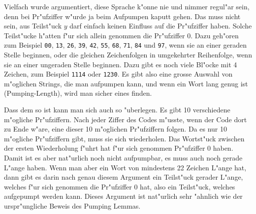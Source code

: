 \begin{loesung}
Vielfach wurde argumentiert, diese Sprache k"onne nie und nimmer
regul"ar sein, denn bei Pr"ufziffer w"urde ja beim Aufpumpen
kaputt gehen. Das muss nicht sein, aus Teilst"uck $y$ darf
einfach keinen Einfluss auf die Pr"ufziffer haben. Solche
Teilst"ucke h"atten f"ur sich allein genommen die Pr"ufziffer 0.
Dazu geh"oren zum Beispiel
{\tt 00},
{\tt 13},
{\tt 26},
{\tt 39},
{\tt 42},
{\tt 55},
{\tt 68},
{\tt 71},
{\tt 84}
und
{\tt 97}, wenn sie an einer geraden Stelle beginnen, oder
die gleichen Zeichenfolgen in umgekehrter Reihenfolge, wenn sie
an einer ungeraden Stelle beginnen.
Dazu gibt es noch viele Bl"ocke mit 4 Zeichen, zum Beispiel
{\tt 1114} oder {\tt 1230}. Es gibt also eine grosse Auswahl von
m"oglichen Strings, die man aufpumpen kann, und wenn ein Wort
lang genug ist (Pumping-Length), wird man sicher eines finden.

Dass dem so ist kann man sich auch so "uberlegen. Es gibt 10
verschiedene m"ogliche Pr"ufziffern. Nach jeder Ziffer des Codes m"usste,
wenn der Code dort zu Ende w"are, eine dieser 10 m"oglichen Pr"ufziffern
folgen. Da es nur 10 m"ogliche Pr"ufziffern gibt, muss sie sich
wiederholen.
Das Wortst"uck zwischen der ersten Wiederholung f"uhrt hat f"ur sich
genommen Pr"ufziffer 0 haben. Damit ist es aber nat"urlich noch
nicht aufpumpbar, es muss auch noch gerade L"ange haben. Wenn man
aber ein Wort von mindestens 22 Zeichen L"ange hat, dann gibt es
darin nach genau diesem Argument ein Teilst"uck gerader L"ange,
welches f"ur sich genommen die Pr"ufziffer 0 hat, also ein Teilst"uck,
welches aufgepumpt werden kann. Dieses Argument ist nat"urlich
sehr "ahnlich wie der urspr"ungliche Beweis des Pumping Lemmas.


\end{loesung}

